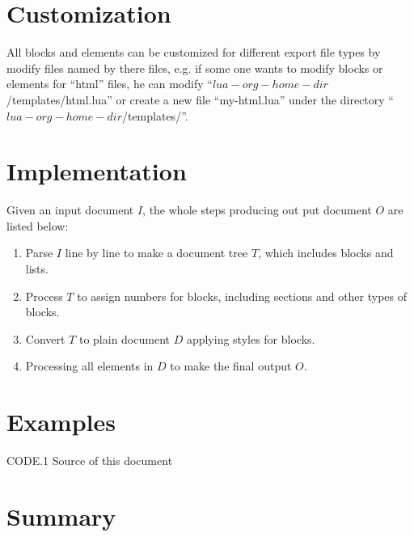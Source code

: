 \documentclass[8pt]{beamer}
\begin{document}
\section{Customization} \label{SEC:6}
All blocks and elements can be customized for different export file types by modify files named by there files, e.g. if some one wants to modify blocks or elements for ``html'' files, he can modify ``$lua-org-home-dir$/templates/html.lua'' or create a new file ``my-html.lua'' under the directory ``$lua-org-home-dir$/templates/''.

\section{Implementation} \label{SEC:7}
Given an input document \(I\), the whole steps producing out put document \(O\) are listed below:

\begin{enumerate}
\item{Parse \(I\) line by line to make a document tree \(T\), which includes blocks and lists.}
\item{Process \(T\) to assign numbers for blocks, including sections and other types of blocks.}
\item{Convert \(T\) to plain document \(D\) applying styles for blocks.}
\item{Processing all elements in \(D\) to make the final output \(O\).}
\end{enumerate}

\section{Examples} \label{SEC:8}
CODE.1 Source of this document \label{CODE:1}

\section{Summary} \label{SEC:9}

{
}
\end{document}
